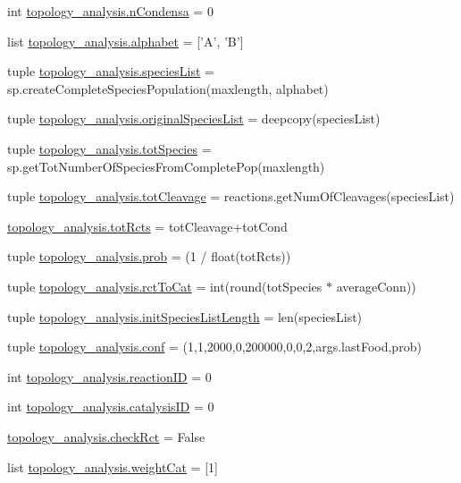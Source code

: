 \begin{DoxyCompactItemize}
\item 
int \hyperlink{a00128_a38aa665f11207bbd8cd2da4c382d4aca}{topology\-\_\-analysis.\-n\-Condensa} = 0
\item 
list \hyperlink{a00128_ab0d9c13eee214bf78b20760bf2835248}{topology\-\_\-analysis.\-alphabet} = \mbox{[}'A', 'B'\mbox{]}
\item 
tuple \hyperlink{a00128_a5bfc4cfa78ac777159cb0ca9c9c5c2f6}{topology\-\_\-analysis.\-species\-List} = sp.\-create\-Complete\-Species\-Population(maxlength, alphabet)
\item 
tuple \hyperlink{a00128_a62b034cfe14eff36f09dd65a51ae7c9c}{topology\-\_\-analysis.\-original\-Species\-List} = deepcopy(species\-List)
\item 
tuple \hyperlink{a00128_ac657414359bc072005d43b2328119a7d}{topology\-\_\-analysis.\-tot\-Species} = sp.\-get\-Tot\-Number\-Of\-Species\-From\-Complete\-Pop(maxlength)
\item 
tuple \hyperlink{a00128_a1e875e49e1f980d461a398fd6a072b0b}{topology\-\_\-analysis.\-tot\-Cleavage} = reactions.\-get\-Num\-Of\-Cleavages(species\-List)
\item 
\hyperlink{a00128_a059c41eb160321f87ba469fddd20eda7}{topology\-\_\-analysis.\-tot\-Rcts} = tot\-Cleavage+tot\-Cond
\item 
tuple \hyperlink{a00128_aad2c05e3d2146196ed236911dd796f6e}{topology\-\_\-analysis.\-prob} = (1 / float(tot\-Rcts))
\item 
tuple \hyperlink{a00128_afa804d4b1d39a63de9f14e5ab379ae34}{topology\-\_\-analysis.\-rct\-To\-Cat} = int(round(tot\-Species $\ast$ average\-Conn))
\item 
tuple \hyperlink{a00128_af2370a811b14632a793a28e451be8150}{topology\-\_\-analysis.\-init\-Species\-List\-Length} = len(species\-List)
\item 
tuple \hyperlink{a00128_aa468c4ff92202c7d89fb631e8cb54dc8}{topology\-\_\-analysis.\-conf} = (1,1,2000,0,200000,0,0,2,args.\-last\-Food,prob)
\item 
int \hyperlink{a00128_a07d632b487fabd051ab725ee95a85368}{topology\-\_\-analysis.\-reaction\-I\-D} = 0
\item 
int \hyperlink{a00128_a35953bf84aa0f7a2a3ffa3f68190c0fa}{topology\-\_\-analysis.\-catalysis\-I\-D} = 0
\item 
\hyperlink{a00128_a6f49caf3b9250cab918ae8dc5aef9931}{topology\-\_\-analysis.\-check\-Rct} = False
\item 
list \hyperlink{a00128_a67cf979bfd8cf26867524a1a788a5e63}{topology\-\_\-analysis.\-weight\-Cat} = \mbox{[}1\mbox{]}

\end{DoxyCompactItemize}
